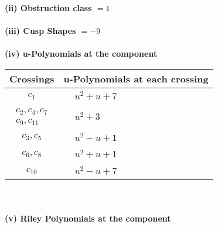 \documentclass[1p]{elsarticle_modified}
\theoremstyle{definition}
\begin{document}
\flushleft \textbf{(ii) Obstruction class $= 1$}\\~\\
\flushleft \textbf{(iii) Cusp Shapes $= -9$}\\~\\
\newpage\renewcommand{\arraystretch}{1}
\flushleft \textbf{(iv) u-Polynomials at the component}\newline \\
\begin{tabular}{m{50pt}|m{274pt}}
Crossings & \hspace{64pt}u-Polynomials at each crossing \\
\hline $$\begin{aligned}c_{1}\end{aligned}$$&$\begin{aligned}
&u^2+u+7
\end{aligned}$\\
\hline $$\begin{aligned}c_{2},c_{4},c_{7}\\c_{9},c_{11}\end{aligned}$$&$\begin{aligned}
&u^2+3
\end{aligned}$\\
\hline $$\begin{aligned}c_{3},c_{5}\end{aligned}$$&$\begin{aligned}
&u^2- u+1
\end{aligned}$\\
\hline $$\begin{aligned}c_{6},c_{8}\end{aligned}$$&$\begin{aligned}
&u^2+u+1
\end{aligned}$\\
\hline $$\begin{aligned}c_{10}\end{aligned}$$&$\begin{aligned}
&u^2- u+7
\end{aligned}$\\
\hline
\end{tabular}\\~\\
\newpage\renewcommand{\arraystretch}{1}
\flushleft \textbf{(v) Riley Polynomials at the component}\newline \\
\end{document}
